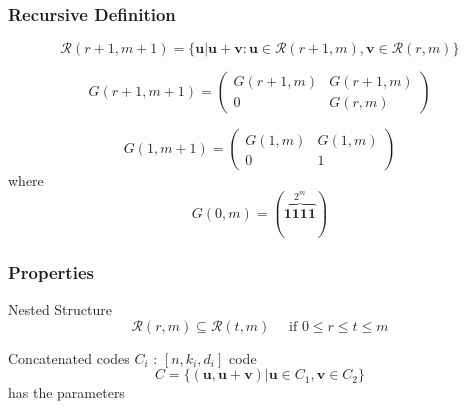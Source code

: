 \documentclass[xcolor=xvgnames]{beamer}
\newcommand{\RM}[2]{\ensuremath{\mathcal{R}(#1,#2)}}
\newcommand{\V}[1]{\ensuremath{\mathbf{#1}}}
\begin{document}

\begin{frame}
 \frametitle{Recursive Definition}
\begin{theorem}
\begin{equation*} \RM{r+1}{m+1} =  \{ \V{u} | \V{u}+\V{v} : \V{u} \in \RM{r+1}{m}, \V{v} \in \RM{r}{m} \} \end{equation*}
\end{theorem}

\begin{equation*}
G(r+1,m+1) = \begin{pmatrix}
G(r+1,m) & G(r+1,m) \\
0 & G(r,m) 
\end{pmatrix}
\end{equation*}


\begin{equation*}
G(1,m+1) = \begin{pmatrix}
G(1,m) & G(1,m) \\
0 & 1
\end{pmatrix}
\end{equation*}
where
\begin{equation*}
  G(0,m) = ( {\overbrace{\V{1111}}^{2^m}} )
\end{equation*}

\end{frame}


\begin{frame}
  \frametitle{Properties}

 \begin{block}{Nested Structure}
\begin{equation*}
\RM{r}{m} \subseteq \RM{t}{m} \quad
\text{ if } 0 \leq r \leq t \leq m 
\end{equation*}

\end{block}

\begin{block}{Concatenated codes}
$C_i$ : $[n,k_i,d_i]$ code
\begin{equation*}
C = \{(\V{u},\V{u}+\V{v}) | \V{u} \in C_1 , \V{v} \in C_2 \}
\end{equation*}
has the parameters 
\begin{equation*}
[2n, k_1+k_2, min\{2d_1,d_2\}]
\end{equation*}
\end{block}

\end{frame}
\end{document}
